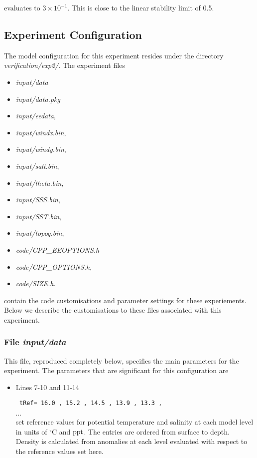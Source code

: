 {\noindent evaluates to $3 \times 10^{-1}$. This is close to the linear
stability limit of 0.5.
  
\subsection{Experiment Configuration}
\label{SEC:clim_ocn_examp_exp_config}

The model configuration for this experiment resides under the 
directory {\it verification/exp2/}.  The experiment files 
\begin{itemize}
\item {\it input/data}
\item {\it input/data.pkg}
\item {\it input/eedata},
\item {\it input/windx.bin},
\item {\it input/windy.bin},
\item {\it input/salt.bin},
\item {\it input/theta.bin},
\item {\it input/SSS.bin},
\item {\it input/SST.bin},
\item {\it input/topog.bin},
\item {\it code/CPP\_EEOPTIONS.h}
\item {\it code/CPP\_OPTIONS.h},
\item {\it code/SIZE.h}. 
\end{itemize}
contain the code customisations and parameter settings for these
experiements. Below we describe the customisations
to these files associated with this experiment.

\subsubsection{File {\it input/data}}

This file, reproduced completely below, specifies the main parameters 
for the experiment. The parameters that are significant for this configuration
are

\begin{itemize}

\item Lines 7-10 and 11-14 
\begin{verbatim} tRef= 16.0 , 15.2 , 14.5 , 13.9 , 13.3 ,  \end{verbatim} 
$\cdots$ \\
set reference values for potential
temperature and salinity at each model level in units of $^{\circ}$C and
${\rm ppt}$. The entries are ordered from surface to depth.
Density is calculated from anomalies at each level evaluated
with respect to the reference values set here.\\



\end{itemize}}

